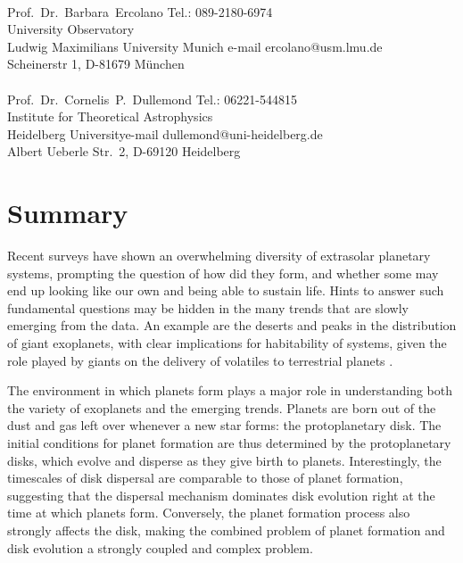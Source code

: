 \documentclass[10pt,fleqn,twoside]{article}
\begin{document}
\\
Prof.~Dr.~Barbara~Ercolano \hfill Tel.: 089-2180-6974\\
University Observatory  \\
Ludwig Maximilians University Munich \hfill e-mail ercolano@usm.lmu.de\\
Scheinerstr 1, D-81679 M\"unchen\\

\\
Prof.~Dr.~Cornelis~P.~Dullemond \hfill Tel.: 06221-544815\\
Institute for Theoretical Astrophysics\\
 Heidelberg University\hfill e-mail dullemond@uni-heidelberg.de\\
Albert Ueberle Str.\ 2, D-69120 Heidelberg\\


\pagebreak[4]

\fontsize{11}{12}\selectfont

\section{Summary}

Recent surveys have shown an overwhelming diversity of extrasolar
planetary systems, prompting the question of how did they form,
and whether some may end up
looking like our own and being able to sustain life. Hints to answer
such fundamental questions may be hidden in the many trends that are
slowly emerging from the data. An example are the deserts and peaks in the distribution of
giant exoplanets, with clear implications for habitability of systems,
given the role played by giants on the delivery of volatiles to
terrestrial planets \citep[e.g.,][]{2014ApJ...786...33Q}. 

The environment
in which planets form plays a major role in understanding both the
variety of exoplanets and the emerging trends. Planets are
born out of the dust and gas left over whenever a new star forms: the
protoplanetary disk. The initial conditions for planet formation
are thus determined by the protoplanetary disks, which evolve and disperse as they
give birth to planets. Interestingly, the timescales of disk dispersal
are comparable to those of planet formation, suggesting that the
dispersal mechanism dominates disk evolution right at the time at
which planets form.  Conversely, the planet formation process also
strongly affects the disk, making the combined problem of planet formation
and disk evolution a strongly coupled and complex problem. 
\end{document}
